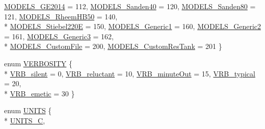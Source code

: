 \begin{DoxyCompactItemize}
\hyperlink{class_h_p_w_h_acf117eb928a21b7b757b653455a2338ea96053ae26eb5a7881516e6ca9895c8fe}{M\-O\-D\-E\-L\-S\-\_\-\-G\-E2014} = 112, 
\hyperlink{class_h_p_w_h_acf117eb928a21b7b757b653455a2338ea1b192b7d9633eb132182d6f82ae7d26e}{M\-O\-D\-E\-L\-S\-\_\-\-Sanden40} = 120, 
\hyperlink{class_h_p_w_h_acf117eb928a21b7b757b653455a2338ea3cb4056ec2f089b2ac3b0bd4378cc04f}{M\-O\-D\-E\-L\-S\-\_\-\-Sanden80} = 121, 
\hyperlink{class_h_p_w_h_acf117eb928a21b7b757b653455a2338ea7746924521f756aa71b4afd3711056c4}{M\-O\-D\-E\-L\-S\-\_\-\-Rheem\-H\-B50} = 140, 
\\*
\hyperlink{class_h_p_w_h_acf117eb928a21b7b757b653455a2338eac2c67a3f6113fac00ed344031538f2da}{M\-O\-D\-E\-L\-S\-\_\-\-Stiebel220\-E} = 150, 
\hyperlink{class_h_p_w_h_acf117eb928a21b7b757b653455a2338ea81d6be9245ab15f491dda7c7883fdac1}{M\-O\-D\-E\-L\-S\-\_\-\-Generic1} = 160, 
\hyperlink{class_h_p_w_h_acf117eb928a21b7b757b653455a2338ea46a66cab956c1c8093e2bbf97193bd5b}{M\-O\-D\-E\-L\-S\-\_\-\-Generic2} = 161, 
\hyperlink{class_h_p_w_h_acf117eb928a21b7b757b653455a2338ea84df992c74aa90062776ff63b1bf7798}{M\-O\-D\-E\-L\-S\-\_\-\-Generic3} = 162, 
\\*
\hyperlink{class_h_p_w_h_acf117eb928a21b7b757b653455a2338eabc81b43c524352b876dcfe84631ffe93}{M\-O\-D\-E\-L\-S\-\_\-\-Custom\-File} = 200, 
\hyperlink{class_h_p_w_h_acf117eb928a21b7b757b653455a2338ea81d2151cfd33bfcf84f3b76320484cda}{M\-O\-D\-E\-L\-S\-\_\-\-Custom\-Res\-Tank} = 201
 \}
\item 
enum \hyperlink{class_h_p_w_h_aa493e3f78affa7dafde7e297cc68673c}{V\-E\-R\-B\-O\-S\-I\-T\-Y} \{ \\*
\hyperlink{class_h_p_w_h_aa493e3f78affa7dafde7e297cc68673ca2883a012f3515137cba205b5de85f951}{V\-R\-B\-\_\-silent} = 0, 
\hyperlink{class_h_p_w_h_aa493e3f78affa7dafde7e297cc68673ca36d834ce58908601e3b19c2b924c7c3f}{V\-R\-B\-\_\-reluctant} = 10, 
\hyperlink{class_h_p_w_h_aa493e3f78affa7dafde7e297cc68673ca14987539abc3393c85bad9f106663061}{V\-R\-B\-\_\-minute\-Out} = 15, 
\hyperlink{class_h_p_w_h_aa493e3f78affa7dafde7e297cc68673caaeea8191e4dd9f042e65043dd33be0a6}{V\-R\-B\-\_\-typical} = 20, 
\\*
\hyperlink{class_h_p_w_h_aa493e3f78affa7dafde7e297cc68673caf7321f6f365930516c2c642464b030e1}{V\-R\-B\-\_\-emetic} = 30
 \}
\item 
enum \hyperlink{class_h_p_w_h_a145320dbf116b9245ac4421026cff294}{U\-N\-I\-T\-S} \{ \\*
\hyperlink{class_h_p_w_h_a145320dbf116b9245ac4421026cff294a9acbc83e5ccf401979254f688c20426b}{U\-N\-I\-T\-S\-\_\-\-C}, 

\end{DoxyCompactItemize}
